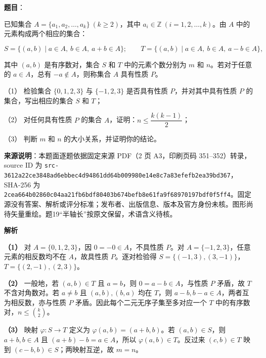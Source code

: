 \begin{answer}

\textbf{题目}：

已知集合 $A=\{a_1,a_2,\ldots,a_k\}\ (k\geq 2)$，其中 $a_i\in\mathbb{Z}\ (i=1,2,\ldots,k)$。由 $A$ 中的元素构成两个相应的集合：

\nopagebreak[4]
\[
S=\{(a,b)\mid a\in A,\ b\in A,\ a+b\in A\};\qquad
T=\{(a,b)\mid a\in A,\ b\in A,\ a-b\in A\},
\]

其中 $(a,b)$ 是有序数对，集合 $S$ 和 $T$ 中的元素个数分别为 $m$ 和 $n$。若对于任意的 $a\in A$，总有 $-a\notin A$，则称集合 $A$ 具有性质 $P$。

（1） 检验集合 $\{0,1,2,3\}$ 与 $\{-1,2,3\}$ 是否具有性质 $P$，并对其中具有性质 $P$ 的集合，写出相应的集合 $S$ 和 $T$；

（2） 对任何具有性质 $P$ 的集合 $A$，证明：$n\leq \dfrac{k(k-1)}2$；

（3） 判断 $m$ 和 $n$ 的大小关系，并证明你的结论。

\begin{gktip}
\textbf{来源说明}：本题面逐题依据固定来源 PDF（2 页 A3，印刷页码 351–352）转录，source ID 为 \texttt{src-3612a22ce3848ad6ebbec4d94861dd64b009980e14e8c7a83efefb2ea39bd367}，SHA-256 为 \texttt{2cea664b02860c04aa21fb6bdf80403b674befb8e61fa9f68970197bdf0f5ff4}。固定源没有答案、解析或评分标准；发布者、出版信息、版本及官方身份未核。图形尚待矢量重绘。题19“半轴长”按原文保留，术语含义待核。
\end{gktip}

\textbf{解析}

\textbf{（1）} 对 $A=\{0,1,2,3\}$，因 $0=-0\in A$，不具性质 $P$。对 $A=\{-1,2,3\}$，任意元素的相反数均不在 $A$，故具性质 $P$。逐对检验得
$S=\{(-1,3),(3,-1)\}$，$T=\{(2,-1),(2,3)\}$。

\textbf{（2）} 一般地，若 $(a,b)\in T$ 且 $a=b$，则 $0=a-b\in A$，与性质 $P$ 矛盾，故 $T$ 不含对角数对。若 $a\ne b$ 且 $(a,b),(b,a)$ 均在 $T$，则 $a-b,b-a\in A$，两者互为相反数，亦与性质 $P$ 矛盾。因此每个二元无序子集至多对应一个 $T$ 中的有序数对，$n\le\binom{k}{2}$。

\textbf{（3）} 映射 $\varphi:S\to T$ 定义为 $\varphi(a,b)=(a+b,b)$。若 $(a,b)\in S$，则 $a+b,b\in A$ 且 $(a+b)-b=a\in A$，所以 $\varphi(a,b)\in T$。反过来 $(c,b)\in T$ 映到 $(c-b,b)\in S$；两映射互逆，故 $m=n$。




\end{answer}